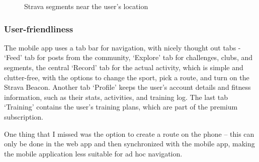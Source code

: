 \begin{figure}[htb!]
    \centering
        \caption{Strava segments near the user's location \cite{strava-segments-img}}
        \label{strava-segments-img}
\end{figure}

\subsubsection*{User-friendliness}
The mobile app uses a tab bar for navigation, with nicely thought out tabs - `Feed' tab for posts from the community, `Explore' tab for challenges, clubs, and segments,
the central `Record' tab for the actual activity, which is simple and clutter-free, with the options to change the sport, pick a route, and turn on the Strava Beacon.
Another tab `Profile' keeps the user's account details and fitness information, such as their stats, activities, and training log.
The last tab `Training' contains the user's training plans, which are part of the premium subscription.

One thing that I missed was the option to create a route on the phone -- this can only be done in the web app and then synchronized with the mobile app, making the mobile application less suitable for ad hoc navigation.

